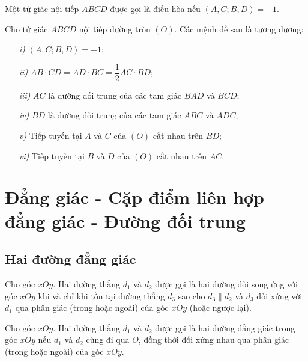 \documentclass{article} %
\begin{document}
        \begin{definition}
            Một tứ giác nội tiếp \(ABCD\) được gọi là điều hòa nếu \((A,C;B,D) = -1\).
        \end{definition}

        \begin{theorem}
            Cho tứ giác \(ABCD\) nội tiếp đường tròn \((O)\). Các mệnh đề sau là tương đương:
            \begin{enumerate}
                \item[\textit{i)}] \((A,C;B,D) = -1\);
                \item[\textit{ii)}] \(AB \cdot CD = AD \cdot BC = \dfrac{1}{2}AC \cdot BD\);
                \item[\textit{iii)}] \(AC\) là đường đối trung của các tam giác \(BAD\) và \(BCD\);
                \item[\textit{iv)}] \(BD\) là đường đối trung của các tam giác \(ABC\) và \(ADC\);
                \item[\textit{v)}] Tiếp tuyến tại \(A\) và \(C\) của \((O)\) cắt nhau trên \(BD\);
                \item[\textit{vi)}] Tiếp tuyến tại \(B\) và \(D\) của \((O)\) cắt nhau trên \(AC\).
            \end{enumerate}
        \end{theorem}

    \section{Đẳng giác - Cặp điểm liên hợp đẳng giác - Đường đối trung}

    \subsection{Hai đường đẳng giác}

        \begin{definition}
            Cho góc \(xOy\). Hai đường thẳng \(d_1\) và \(d_2\) được gọi là hai đường đối song ứng với góc \(xOy\) khi và chỉ khi tồn tại đường thẳng \(d_3\) sao cho \(d_3 \parallel d_2\) và \(d_3\) đối xứng với \(d_1\) qua phân giác (trong hoặc ngoài) của góc \(xOy\) (hoặc ngược lại).
        \end{definition}

        \begin{definition}
            Cho góc \(xOy\). Hai đường thẳng \(d_1\) và \(d_2\) được gọi là hai đường đẳng giác trong góc \(xOy\) nếu \(d_1\) và \(d_2\) cùng đi qua \(O\), đồng thời đối xứng nhau qua phân giác (trong hoặc ngoài) của góc \(xOy\).
        \end{definition}
\end{document}
